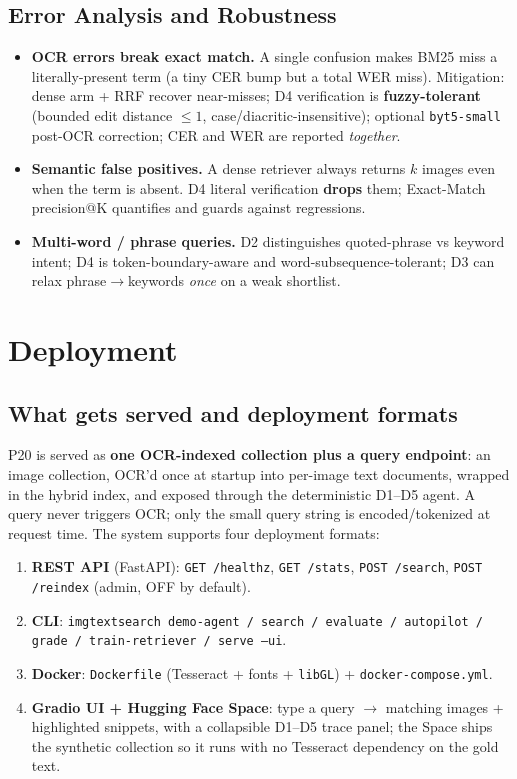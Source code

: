 \documentclass[12pt,a4paper]{article}
\begin{document}
\subsection{Error Analysis and Robustness}

\begin{itemize}\setlength\itemsep{0.12em}
  \item \textbf{OCR errors break exact match.} A single confusion makes BM25 miss a literally-present term (a tiny CER bump but a total WER miss). Mitigation: dense arm + RRF recover near-misses; D4 verification is \textbf{fuzzy-tolerant} (bounded edit distance $\le 1$, case/diacritic-insensitive); optional \texttt{byt5-small} post-OCR correction; CER and WER are reported \emph{together}.
  \item \textbf{Semantic false positives.} A dense retriever always returns $k$ images even when the term is absent. D4 literal verification \textbf{drops} them; Exact-Match precision@K quantifies and guards against regressions.
  \item \textbf{Multi-word / phrase queries.} D2 distinguishes quoted-phrase vs keyword intent; D4 is token-boundary-aware and word-subsequence-tolerant; D3 can relax phrase$\rightarrow$keywords \emph{once} on a weak shortlist.
\end{itemize}

\section{Deployment}

\subsection{What gets served and deployment formats}

P20 is served as \textbf{one OCR-indexed collection plus a query endpoint}: an image collection, OCR'd once at startup into per-image text documents, wrapped in the hybrid index, and exposed through the deterministic D1--D5 agent. A query never triggers OCR; only the small query string is encoded/tokenized at request time. The system supports four deployment formats:
\begin{enumerate}\setlength\itemsep{0.1em}
  \item \textbf{REST API} (FastAPI): \texttt{GET /healthz}, \texttt{GET /stats}, \texttt{POST /search}, \texttt{POST /reindex} (admin, OFF by default).
  \item \textbf{CLI}: \texttt{imgtextsearch demo-agent / search / evaluate / autopilot / grade / train-retriever / serve --ui}.
  \item \textbf{Docker}: \texttt{Dockerfile} (Tesseract + fonts + \texttt{libGL}) + \texttt{docker-compose.yml}.
  \item \textbf{Gradio UI + Hugging Face Space}: type a query $\rightarrow$ matching images + highlighted snippets, with a collapsible D1--D5 trace panel; the Space ships the synthetic collection so it runs with no Tesseract dependency on the gold text.
\end{enumerate}
\end{document}

